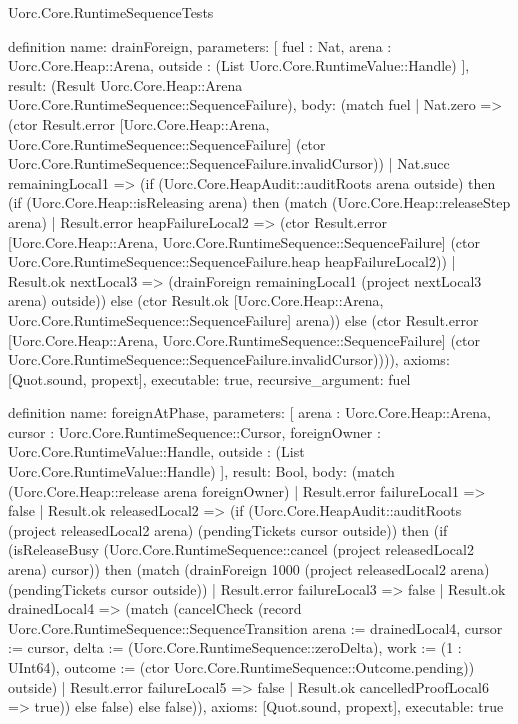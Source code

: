 \begin{lexlean}{Uorc.Core.RuntimeSequenceTests}
\begin{semanticmodule}
definition{
  name: drainForeign,
  parameters: [
    fuel : Nat,
    arena : Uorc.Core.Heap::Arena,
    outside : (List Uorc.Core.RuntimeValue::Handle)
  ],
  result: (Result Uorc.Core.Heap::Arena Uorc.Core.RuntimeSequence::SequenceFailure),
  body: (match fuel
    | Nat.zero => (ctor Result.error [Uorc.Core.Heap::Arena, Uorc.Core.RuntimeSequence::SequenceFailure] (ctor Uorc.Core.RuntimeSequence::SequenceFailure.invalidCursor))
    | Nat.succ remainingLocal1 => (if (Uorc.Core.HeapAudit::auditRoots arena outside) then (if (Uorc.Core.Heap::isReleasing arena) then (match (Uorc.Core.Heap::releaseStep arena)
      | Result.error heapFailureLocal2 => (ctor Result.error [Uorc.Core.Heap::Arena, Uorc.Core.RuntimeSequence::SequenceFailure] (ctor Uorc.Core.RuntimeSequence::SequenceFailure.heap heapFailureLocal2))
      | Result.ok nextLocal3 => (drainForeign remainingLocal1 (project nextLocal3 arena) outside)) else (ctor Result.ok [Uorc.Core.Heap::Arena, Uorc.Core.RuntimeSequence::SequenceFailure] arena)) else (ctor Result.error [Uorc.Core.Heap::Arena, Uorc.Core.RuntimeSequence::SequenceFailure] (ctor Uorc.Core.RuntimeSequence::SequenceFailure.invalidCursor)))),
  axioms: [Quot.sound, propext],
  executable: true,
  recursive_argument: fuel
}

definition{
  name: foreignAtPhase,
  parameters: [
    arena : Uorc.Core.Heap::Arena,
    cursor : Uorc.Core.RuntimeSequence::Cursor,
    foreignOwner : Uorc.Core.RuntimeValue::Handle,
    outside : (List Uorc.Core.RuntimeValue::Handle)
  ],
  result: Bool,
  body: (match (Uorc.Core.Heap::release arena foreignOwner)
    | Result.error failureLocal1 => false
    | Result.ok releasedLocal2 => (if (Uorc.Core.HeapAudit::auditRoots (project releasedLocal2 arena) (pendingTickets cursor outside)) then (if (isReleaseBusy (Uorc.Core.RuntimeSequence::cancel (project releasedLocal2 arena) cursor)) then (match (drainForeign 1000 (project releasedLocal2 arena) (pendingTickets cursor outside))
      | Result.error failureLocal3 => false
      | Result.ok drainedLocal4 => (match (cancelCheck (record Uorc.Core.RuntimeSequence::SequenceTransition {arena := drainedLocal4, cursor := cursor, delta := (Uorc.Core.RuntimeSequence::zeroDelta), work := (1 : UInt64), outcome := (ctor Uorc.Core.RuntimeSequence::Outcome.pending)}) outside)
        | Result.error failureLocal5 => false
        | Result.ok cancelledProofLocal6 => true)) else false) else false)),
  axioms: [Quot.sound, propext],
  executable: true
}


\end{semanticmodule}
\end{lexlean}
